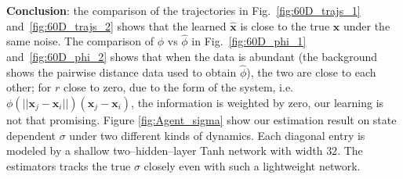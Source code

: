 \documentclass[11pt]{article} %
\def\rvx{{\mathbf{x}}}
\newcommand{\norm}[1]{||#1||}
\begin{document}
\textbf{Conclusion}: the comparison of the trajectories in Fig.~\ref{fig:60D_trajs_1} and~\ref{fig:60D_trajs_2} shows that the learned $\hat\rvx$ is close to the true $\rvx$ under the same noise.  The comparison of $\phi$ vs $\hat\phi$ in Fig.~\ref{fig:60D_phi_1} and~\ref{fig:60D_phi_2} shows that when the data is abundant (the background shows the pairwise distance data used to obtain $\hat\phi$), the two are close to each other;  for $r$ close to zero, due to the form of the system, i.e. $\phi(\norm{\rvx_j - \rvx_i})(\rvx_j - \rvx_i)$, the information is weighted by zero, our learning is not that promising.  Figure \ref{fig:Agent_sigma} show our estimation result on state dependent \(\sigma\) under two different kinds of dynamics. Each diagonal entry is modeled by a shallow two–hidden–layer Tanh network with width $32$. The estimators tracks the true $\sigma$ closely even with such a lightweight network. 
%
\end{document}
